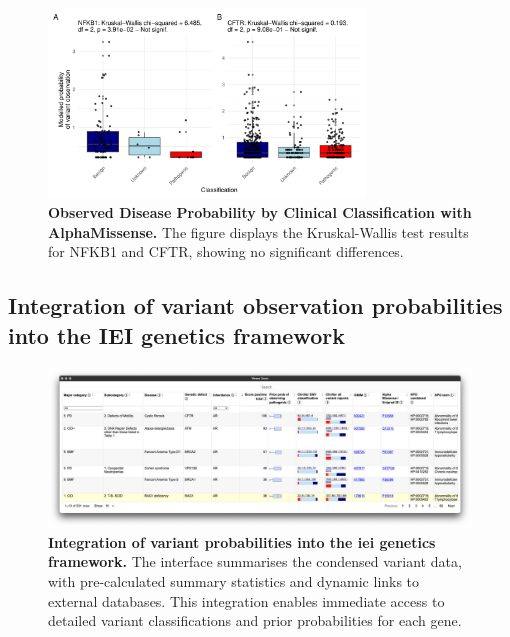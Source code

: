 \begin{figure}[h]
  \centering
  \includegraphics[width=0.75\textwidth]{../images/p_alphamissense_kw.pdf}
  \caption{\textbf{Observed Disease Probability by Clinical Classification with AlphaMissense.} The figure displays the Kruskal-Wallis test results for NFKB1 and CFTR, showing no significant differences.}
  \label{fig:alphamissense_kw}
\end{figure}

\FloatBarrier

\subsection{Integration of variant observation probabilities into the IEI genetics framework}

\begin{figure}[h]
  \centering
  \includegraphics[width=.8\textwidth]{../images/var_risk_est_iei_genetics.png}
  \caption{
    \textbf{Integration of variant probabilities into the \ac{iei} genetics framework.}
    The interface summarises the condensed variant data, with pre-calculated summary statistics and dynamic links to external databases. This integration enables immediate access to detailed variant classifications and prior probabilities for each gene.
  }
  \label{fig:var_risk_est_iei_genetics}
\end{figure}







